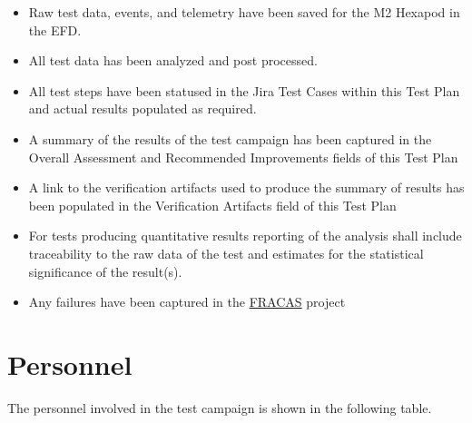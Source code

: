 \documentclass[SE,lsstdraft,STR,toc]{lsstdoc}
\providecommand{\tightlist}{
  \setlength{\itemsep}{0pt}\setlength{\parskip}{0pt}}
\begin{document}
\begin{itemize}
\tightlist
\item
  Raw test data, events, and telemetry have been saved for the M2
  Hexapod in the EFD.
\item
  All test data has been analyzed and post processed.
\item
  All test steps have been statused in the Jira Test Cases within this
  Test Plan and actual results populated as required.
\item
  A summary of the results of the test campaign has been captured in the
  Overall Assessment and Recommended Improvements fields of this Test
  Plan
\item
  A link to the verification artifacts used to produce the summary of
  results has been populated in the Verification Artifacts field of this
  Test Plan
\item
  For tests producing quantitative results reporting of the analysis
  shall include traceability to the raw data of the test and estimates
  for the statistical significance of the result(s).
\item
  Any failures have been captured in the
  \href{https://jira.lsstcorp.org/projects/FRACAS/issues/}{FRACAS}
  project
\end{itemize}


\newpage
\section{Personnel}
\label{sect:personnel}

The personnel involved in the test campaign is shown in the following table.
\end{document}
